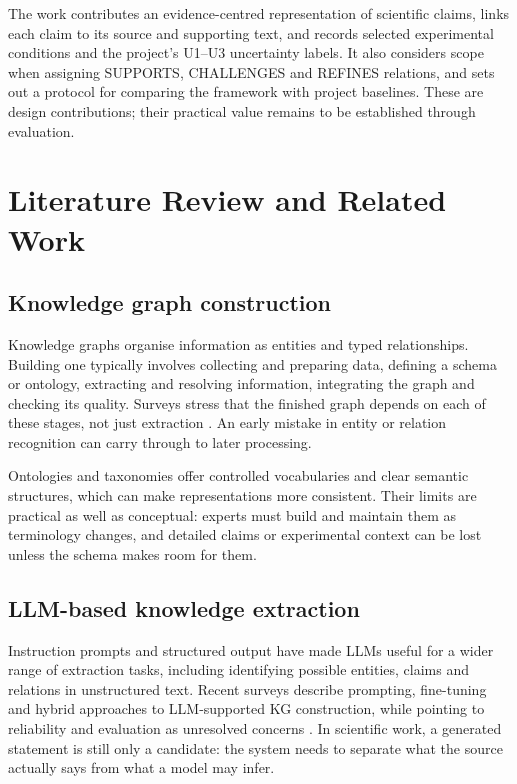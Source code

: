 \documentclass[11pt,a4paper]{article}
\begin{document}
The work contributes an evidence-centred representation of scientific claims, links each claim to its source and supporting text, and records selected experimental conditions and the project's U1--U3 uncertainty labels. It also considers scope when assigning SUPPORTS, CHALLENGES and REFINES relations, and sets out a protocol for comparing the framework with project baselines. These are design contributions; their practical value remains to be established through evaluation.

\section{Literature Review and Related Work}

\subsection{Knowledge graph construction}

Knowledge graphs organise information as entities and typed relationships. Building one typically involves collecting and preparing data, defining a schema or ontology, extracting and resolving information, integrating the graph and checking its quality. Surveys stress that the finished graph depends on each of these stages, not just extraction \citep{hogan2021,kgconstruction2023,kgconstruction2025}. An early mistake in entity or relation recognition can carry through to later processing.

Ontologies and taxonomies offer controlled vocabularies and clear semantic structures, which can make representations more consistent. Their limits are practical as well as conceptual: experts must build and maintain them as terminology changes, and detailed claims or experimental context can be lost unless the schema makes room for them.

\subsection{LLM-based knowledge extraction}

Instruction prompts and structured output have made LLMs useful for a wider range of extraction tasks, including identifying possible entities, claims and relations in unstructured text. Recent surveys describe prompting, fine-tuning and hybrid approaches to LLM-supported KG construction, while pointing to reliability and evaluation as unresolved concerns \citep{ibrahim2024,kgconstruction2025}. In scientific work, a generated statement is still only a candidate: the system needs to separate what the source actually says from what a model may infer.
\end{document}
